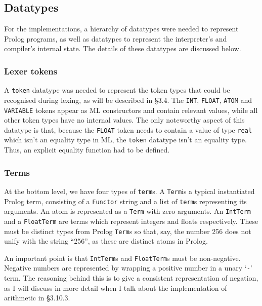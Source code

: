 \documentclass[12pt]{article}
\begin{document}
\subsection{Datatypes}

For the implementations, a hierarchy of datatypes were needed to represent Prolog programs, as well as datatypes to represent the interpreter's and compiler's internal state. The details of these datatypes are discussed below.

\subsubsection{Lexer tokens}

A \verb|token| datatype was needed to represent the token types that could be recognised during lexing, as will be described in \S3.4. 
The \verb|INT|, \verb|FLOAT|, \verb|ATOM| and \verb|VARIABLE| tokens appear as ML constructors and contain relevant values, while all other token types have no internal values. 
The only noteworthy aspect of this datatype is that, because the \verb|FLOAT| token needs to contain a value of type \verb|real| which isn't an equality type in ML, the \verb|token| datatype isn't an equality type. 
Thus, an explicit equality function had to be defined.

\subsubsection{Terms}

At the bottom level, we have four types of \verb|term|s. 
A \verb|Term|\footnotemark[1] is a typical instantiated Prolog term, consisting of a \verb|Functor| string and a list of \verb|term|s representing its arguments. 
An atom is represented as a \verb|Term| with zero arguments.
An \verb|IntTerm| and a \verb|FloatTerm| are terms which represent integers and floats respectively. 
These must be distinct types from Prolog \verb|Term|s so that, say, the number 256 does not unify with the string ``256'', as these are distinct atoms in Prolog.


An important point is that \verb|IntTerm|s and \verb|FloatTerm|s must be non-negative. 
Negative numbers are represented by wrapping a positive number in a unary `\verb|-|' term. 
The reasoning behind this is to give a consistent representation of negation, as I will discuss in more detail when I talk about the implementation of arithmetic in \S3.10.3.
\end{document}
